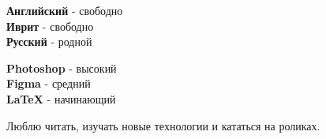\documentclass[9pt]{developercv} %
\begin{document}

\begin{minipage}[t]{0.3\textwidth}
	\vspace{-\baselineskip} %

	
	\textbf{Английский} - свободно\\
	\textbf{Иврит} - свободно\\
	\textbf{Русский} - родной\\
\end{minipage}
\hfill
\begin{minipage}[t]{0.3\textwidth}
	\vspace{-\baselineskip} %
	
  
  \textbf{Photoshop} - высокий \\
  \textbf{Figma} - средний \\ 
  \textbf{\LaTeX} - начинающий \\ 
	
	\end{minipage}
\hfill
\begin{minipage}[t]{0.3\textwidth}
	\vspace{-\baselineskip} %
	

Люблю читать, изучать новые технологии и кататься на роликах.	
	\end{minipage}
\hfill

\end{document}
